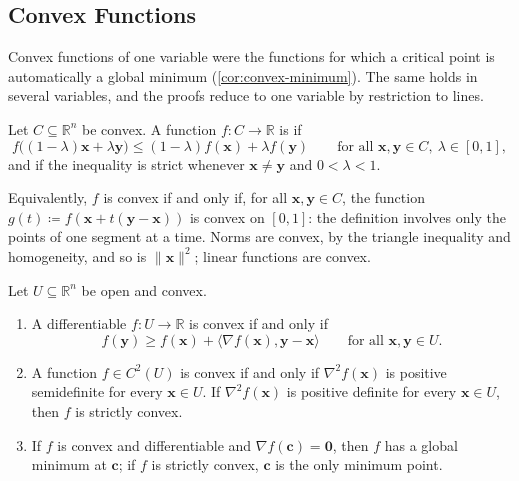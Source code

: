\subsection{Convex Functions}

Convex functions of one variable were the functions for which a critical point is automatically a global minimum (\cref{cor:convex-minimum}). The same holds in several variables, and the proofs reduce to one variable by restriction to lines.

\begin{definition}
\label{def:convex-rn}
Let $C\subseteq\mathbb R^n$ be convex. A function $f\colon C\to\mathbb R$ is  if
\[
f\bigl((1-\lambda)\mathbf x+\lambda\mathbf y\bigr)\le(1-\lambda)f(\mathbf x)+\lambda f(\mathbf y)\qquad\text{for all }\mathbf x,\mathbf y\in C,\ \lambda\in[0,1],
\]
and  if the inequality is strict whenever $\mathbf x\ne\mathbf y$ and $0<\lambda<1$.
\end{definition}

Equivalently, $f$ is convex if and only if, for all $\mathbf x,\mathbf y\in C$, the function $g(t)\coloneqq f(\mathbf x+t(\mathbf y-\mathbf x))$ is convex on $[0,1]$: the definition involves only the points of one segment at a time. Norms are convex, by the triangle inequality and homogeneity, and so is $\|\mathbf x\|^2$; linear functions are convex.

\begin{theorem}
\label{thm:convex-c2}
Let $U\subseteq\mathbb R^n$ be open and convex.
\begin{enumerate}
\item A differentiable $f\colon U\to\mathbb R$ is convex if and only if
\[
f(\mathbf y)\ge f(\mathbf x)+\langle\nabla f(\mathbf x),\mathbf y-\mathbf x\rangle\qquad\text{for all }\mathbf x,\mathbf y\in U .
\]
\item A function $f\in C^2(U)$ is convex if and only if $\nabla^2f(\mathbf x)$ is positive semidefinite for every $\mathbf x\in U$. If $\nabla^2f(\mathbf x)$ is positive definite for every $\mathbf x\in U$, then $f$ is strictly convex.
\item If $f$ is convex and differentiable and $\nabla f(\mathbf c)=\mathbf0$, then $f$ has a global minimum at $\mathbf c$; if $f$ is strictly convex, $\mathbf c$ is the only minimum point.
\end{enumerate}
\end{theorem}

